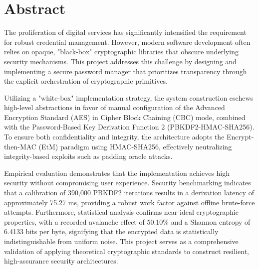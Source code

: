 \chapter*{Abstract}

The proliferation of digital services has significantly intensified the requirement for robust credential management. However, modern software development often relies on opaque, "black-box" cryptographic libraries that obscure underlying security mechanisms. This project addresses this challenge by designing and implementing a secure password manager that prioritizes transparency through the explicit orchestration of cryptographic primitives. 

Utilizing a "white-box" implementation strategy, the system construction eschews high-level abstractions in favor of manual configuration of the Advanced Encryption Standard (AES) in Cipher Block Chaining (CBC) mode, combined with the Password-Based Key Derivation Function 2 (PBKDF2-HMAC-SHA256). To ensure both confidentiality and integrity, the architecture adopts the Encrypt-then-MAC (EtM) paradigm using HMAC-SHA256, effectively neutralizing integrity-based exploits such as padding oracle attacks.

Empirical evaluation demonstrates that the implementation achieves high security without compromising user experience. Security benchmarking indicates that a calibration of 390,000 PBKDF2 iterations results in a derivation latency of approximately 75.27 ms, providing a robust work factor against offline brute-force attempts. Furthermore, statistical analysis confirms near-ideal cryptographic properties, with a recorded avalanche effect of 50.10\% and a Shannon entropy of 6.4133 bits per byte, signifying that the encrypted data is statistically indistinguishable from uniform noise. This project serves as a comprehensive validation of applying theoretical cryptographic standards to construct resilient, high-assurance security architectures.
